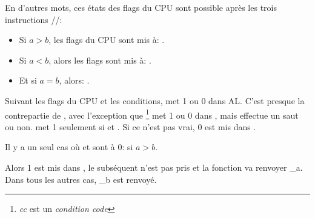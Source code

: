 En d'autres mots, ces états des flags du CPU sont possible après les
trois instructions \FUCOMPP/\FNSTSW/\SAHF:

\begin{itemize}
\item Si $a>b$, les flags du CPU sont mis à: .
\item Si $a<b$, alors les flags sont mis à: .
\item Et si $a=b$, alors: .
\end{itemize}


Suivant les flags du CPU et les conditions, \SETNBE met 1 ou 0 dans AL.
C'est presque la contrepartie de \JNBE, avec l'exception que \SETcc\footnote{\emph{cc}
est un \emph{condition code}} met 1 ou 0 dans \AL, mais \Jcc effectue un saut ou non.
\SETNBE met 1 seulement si  et .
Si ce n'est pas vrai, 0 est mis dans \AL.

Il y a un seul cas où \CF et \ZF sont à 0: si $a>b$.

Alors 1 est mis dans \AL, le \JZ subséquent n'est pas pris et la fonction va renvoyer
{\_a}.
Dans tous les autres cas, {\_b} est renvoyé.

